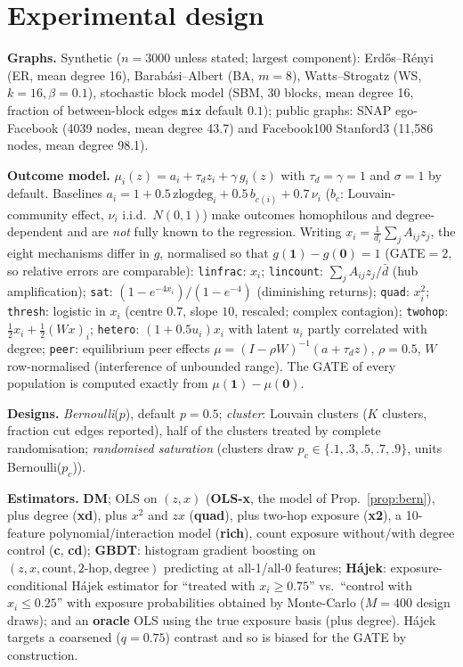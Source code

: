 \section{Experimental design}\label{sec:exp}
\textbf{Graphs.} Synthetic ($n{=}3000$ unless stated; largest component): Erd\H{o}s--R\'enyi (ER, mean degree 16), Barab\'asi--Albert (BA, $m{=}8$), Watts--Strogatz (WS, $k{=}16,\beta{=}0.1$), stochastic block model (SBM, 30 blocks, mean degree 16, fraction of between-block edges $\texttt{mix}$ default $0.1$); public graphs: SNAP ego-Facebook \citep{mcauley2012} (4039 nodes, mean degree 43.7) and Facebook100 Stanford3 \citep{traud2012,rossi2015} (11{,}586 nodes, mean degree 98.1).

\textbf{Outcome model.} $\mu_i(z)=a_i+\tau_dz_i+\gamma\,g_i(z)$ with $\tau_d{=}\gamma{=}1$ and $\sigma{=}1$ by default. Baselines $a_i=1+0.5\,\mathrm{zlogdeg}_i+0.5\,b_{c(i)}+0.7\,\nu_i$ ($b_c$: Louvain-community effect, $\nu_i$ i.i.d.\ $N(0,1)$) make outcomes homophilous and degree-dependent and are \emph{not} fully known to the regression. Writing $x_i=\frac1{d_i}\sum_jA_{ij}z_j$, the eight mechanisms differ in $g$, normalised so that $g(\mathbf 1)-g(\mathbf 0)=1$ (GATE$=2$, so relative errors are comparable): \texttt{linfrac}: $x_i$; \texttt{lincount}: $\sum_jA_{ij}z_j/\bar d$ (hub amplification); \texttt{sat}: $(1-e^{-4x_i})/(1-e^{-4})$ (diminishing returns); \texttt{quad}: $x_i^2$; \texttt{thresh}: logistic in $x_i$ (centre $0.7$, slope $10$, rescaled; complex contagion); \texttt{twohop}: $\frac12x_i+\frac12(Wx)_i$; \texttt{hetero}: $(1+0.5u_i)x_i$ with latent $u_i$ partly correlated with degree; \texttt{peer}: equilibrium peer effects $\mu=(I-\rho W)^{-1}(a+\tau_dz)$, $\rho{=}0.5$, $W$ row-normalised (interference of unbounded range). The GATE of every population is computed exactly from $\mu(\mathbf 1)-\mu(\mathbf 0)$.

\textbf{Designs.} \emph{Bernoulli}($p$), default $p{=}0.5$; \emph{cluster}: Louvain clusters \citep{blondel2008} ($K$ clusters, fraction cut edges reported), half of the clusters treated by complete randomisation; \emph{randomised saturation} (clusters draw $p_c\in\{.1,.3,.5,.7,.9\}$, units Bernoulli($p_c$)).

\textbf{Estimators.} \textbf{DM}; OLS on $(z,x)$ (\textbf{OLS-x}, the model of Prop.~\ref{prop:bern}), plus degree (\textbf{xd}), plus $x^2$ and $zx$ (\textbf{quad}), plus two-hop exposure (\textbf{x2}), a 10-feature polynomial/interaction model (\textbf{rich}), count exposure without/with degree control (\textbf{c}, \textbf{cd}); \textbf{GBDT}: histogram gradient boosting on $(z,x,\text{count},\text{2-hop},\text{degree})$ predicting at all-1/all-0 features; \textbf{H\'ajek}: exposure-conditional H\'ajek estimator for ``treated with $x_i\ge0.75$'' vs.\ ``control with $x_i\le0.25$'' with exposure probabilities obtained by Monte-Carlo ($M{=}400$ design draws); and an \textbf{oracle} OLS using the true exposure basis (plus degree). H\'ajek targets a coarsened ($q{=}0.75$) contrast and so is biased for the GATE by construction.

